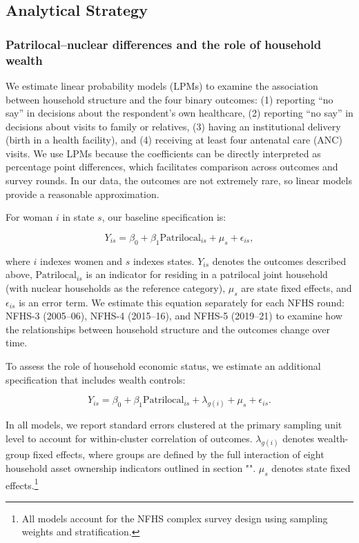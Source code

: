 \documentclass[12pt]{article}
\begin{document}
\subsection{Analytical Strategy}
\subsubsection{Patrilocal–nuclear differences and the role of household wealth}

We estimate linear probability models (LPMs) to examine the association between household structure and the four binary outcomes: (1) reporting ``no say'' in decisions about the respondent's own healthcare, (2) reporting ``no say'' in decisions about visits to family or relatives, (3) having an institutional delivery (birth in a health facility), and (4) receiving at least four antenatal care (ANC) visits. We use LPMs because the coefficients can be directly interpreted as percentage point differences, which facilitates comparison across outcomes and survey rounds. In our data, the outcomes are not extremely rare, so linear models provide a reasonable approximation.

For woman $i$ in state $s$, our baseline specification is:

\begin{equation} \label{eq:nocontrols}
Y_{is} = \beta_0 + \beta_1 \text{Patrilocal}_{is} + \mu_s + \epsilon_{is},
\end{equation}

where $i$ indexes women and $s$ indexes states. $Y_{is}$ denotes the outcomes described above, $\text{Patrilocal}_{is}$ is an indicator for residing in a patrilocal joint household (with nuclear households as the reference category), $\mu_s$ are state fixed effects, and $\epsilon_{is}$ is an error term. We estimate this equation separately for each NFHS round: NFHS-3 (2005--06), NFHS-4 (2015--16), and NFHS-5 (2019--21) to examine how the relationships between household structure and the outcomes change over time.

To assess the role of household economic status, we estimate an additional specification that includes wealth controls:

\begin{equation} \label{eq:controls}
Y_{is} = \beta_0 + \beta_1 \text{Patrilocal}_{is} + \lambda_ {g(i)} + \mu_s + \epsilon_{is}.
\end{equation}

In all models, we report standard errors clustered at the primary sampling unit level to account for within-cluster correlation of outcomes.  $\lambda_{g(i)}$ denotes wealth-group fixed effects, where groups are defined by the full interaction of eight household asset ownership indicators outlined in section "". $\mu_s$ denotes state fixed effects.\footnote{All models account for the NFHS complex survey design using sampling weights and stratification.}
\end{document}
